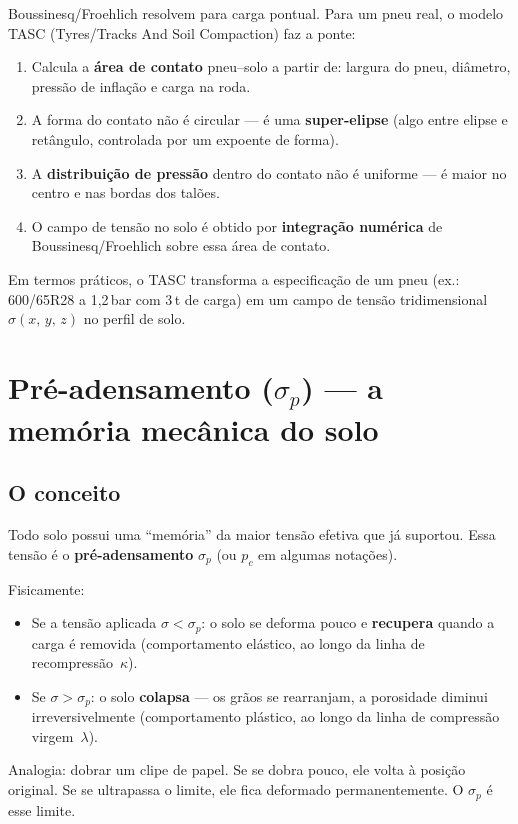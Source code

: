\documentclass[12pt,a4paper]{article}
\newcommand{\Section}[1]{\needspace{12\baselineskip}\section{#1}}
\newcommand{\Subsection}[1]{\needspace{10\baselineskip}\subsection{#1}}
\begin{document}
Boussinesq/Froehlich resolvem para carga pontual. Para um pneu real, o modelo TASC (Tyres/Tracks And Soil Compaction) faz a ponte:

\begin{enumerate}
  \item Calcula a \textbf{área de contato} pneu--solo a partir de: largura do pneu, diâmetro, pressão de inflação e carga na roda.
  \item A forma do contato não é circular --- é uma \textbf{super-elipse} (algo entre elipse e retângulo, controlada por um expoente de forma).
  \item A \textbf{distribuição de pressão} dentro do contato não é uniforme --- é maior no centro e nas bordas dos talões.
  \item O campo de tensão no solo é obtido por \textbf{integração numérica} de Boussinesq/Froehlich sobre essa área de contato.
\end{enumerate}

Em termos práticos, o TASC transforma a especificação de um pneu (ex.: 600/65R28 a 1,2\,bar com 3\,t de carga) em um campo de tensão tridimensional $\sigma(x,\,y,\,z)$ no perfil de solo.

\Section{Pré-adensamento ($\sigma_p$) --- a memória mecânica do solo}

\Subsection{O conceito}

Todo solo possui uma ``memória'' da maior tensão efetiva que já suportou. Essa tensão é o \textbf{pré-adensamento} $\sigma_p$ (ou $p_c$ em algumas notações).

Fisicamente:
\begin{itemize}
  \item Se a tensão aplicada $\sigma < \sigma_p$: o solo se deforma pouco e \textbf{recupera} quando a carga é removida (comportamento elástico, ao longo da linha de recompressão~$\kappa$).
  \item Se $\sigma > \sigma_p$: o solo \textbf{colapsa} --- os grãos se rearranjam, a porosidade diminui irreversivelmente (comportamento plástico, ao longo da linha de compressão virgem~$\lambda$).
\end{itemize}

Analogia: dobrar um clipe de papel. Se se dobra pouco, ele volta à posição original. Se se ultrapassa o limite, ele fica deformado permanentemente. O $\sigma_p$ é esse limite.
\end{document}
